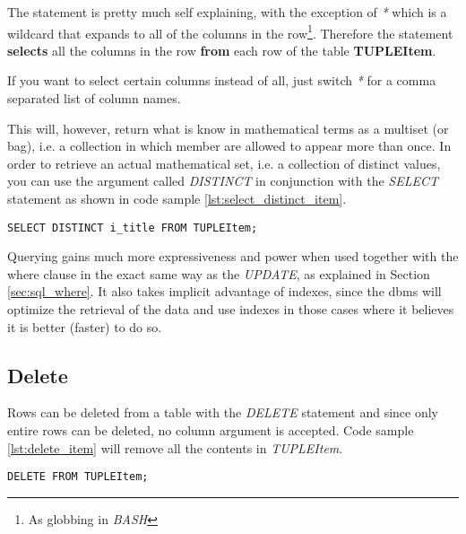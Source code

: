 The statement is pretty much self explaining, with the exception of \emph{*} which is a wildcard that expands to all of the columns in the row\footnote{As globbing in \emph{BASH}}. Therefore the statement \textbf{selects} all the columns in the row \textbf{from} each row of the table \textbf{TUPLEItem}.

If you want to select certain columns instead of all, just switch \emph{*} for a comma separated list of column names.

This will, however, return what is know in mathematical terms as a multiset (or bag), i.e. a collection in which member are allowed to appear more than once. In order to retrieve an actual mathematical set, i.e. a collection of distinct values, you can use the argument called \emph{DISTINCT} in conjunction with the \emph{SELECT} statement as shown in code sample \ref{lst:select_distinct_item}.

\lstset{
  language=SQL, 
  caption=SQL select distinct statement, 
  label=lst:select_distinct_item,
}


\begin{shaded}
\begin{lstlisting}
SELECT DISTINCT i_title FROM TUPLEItem;
\end{lstlisting}  
\end{shaded}  

Querying gains much more expressiveness and power when used together with the where clause in the exact same way as the \emph{UPDATE}, as explained in Section \ref{sec:sql_where}. It also takes implicit advantage of indexes, since the \ac{dbms} will optimize the retrieval of the data and use indexes in those cases where it believes it is better (faster) to do so.

\subsection{Delete}

Rows can be deleted from a table with the \emph{DELETE} statement and since only entire rows can be deleted, no column argument is accepted. Code sample \ref{lst:delete_item} will remove all the contents in \emph{TUPLEItem}.

\lstset{
  language=SQL, 
  caption=SQL delete statement, 
  label=lst:delete_item,
}

\begin{shaded}
\begin{lstlisting}
DELETE FROM TUPLEItem;
\end{lstlisting}  
\end{shaded}

